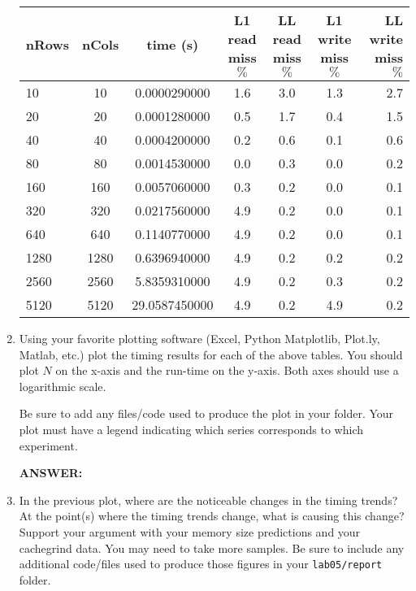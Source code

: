 \documentclass[letter]{article}
\newcommand{\mypath}[1]{\texttt{\path{#1}}}
\begin{document}
\begin{enumerate}
        \begin{center}
        \begin{tabular}{|l | c | c | c  | c | c | r |} 
        \hline
        \textbf{nRows} & \textbf{nCols} & \textbf{time (s)} & L1 read miss $\%$ & LL read miss $\%$ &  L1 write miss $\%$ & LL write miss $\%$\\ \hline
        10 & 10 & 0.0000290000 & 1.6 & 3.0 & 1.3 & 2.7  \\
        20 & 20 & 0.0001280000 & 0.5 & 1.7 & 0.4 & 1.5  \\
        40 & 40 & 0.0004200000 & 0.2 & 0.6 & 0.1 & 0.6  \\
        80 & 80 & 0.0014530000 & 0.0 & 0.3 & 0.0 & 0.2  \\
        160 & 160 & 0.0057060000 & 0.3 & 0.2 & 0.0 & 0.1  \\
        320 & 320 & 0.0217560000 & 4.9 & 0.2 & 0.0 & 0.1  \\
        640 & 640 & 0.1140770000 & 4.9 & 0.2 & 0.0 & 0.1 \\
        1280 & 1280 & 0.6396940000 & 4.9 & 0.2 & 0.2 & 0.2 \\ 
        2560 & 2560 & 5.8359310000 & 4.9 & 0.2 & 0.3 & 0.2  \\
        5120 & 5120 & 29.0587450000 & 4.9 & 0.2 & 4.9 & 0.2  \\\hline
        \end{tabular}
        \end{center}
        
        
        \item Using your favorite plotting software (Excel, Python Matplotlib, Plot.ly, Matlab, etc.) plot the timing results for each of the above tables.  You should plot $N$ on the x-axis and the run-time on the y-axis.  Both axes should use a logarithmic scale.

        Be sure to add any files/code used to produce the plot in your \mypath{lab05/report} folder.  Your plot must have a legend indicating which series corresponds to which experiment.  
        
        \textbf{ANSWER:} %
        
        \item In the previous plot, where are the noticeable changes in the timing trends?   At the point(s) where the timing trends change, what is causing this change?  Support your argument with your memory size predictions and your cachegrind data. You may need to take more samples.  Be sure to include any additional code/files used to produce those figures in your \texttt{lab05/report} folder.
        

\end{enumerate}
\end{document}
